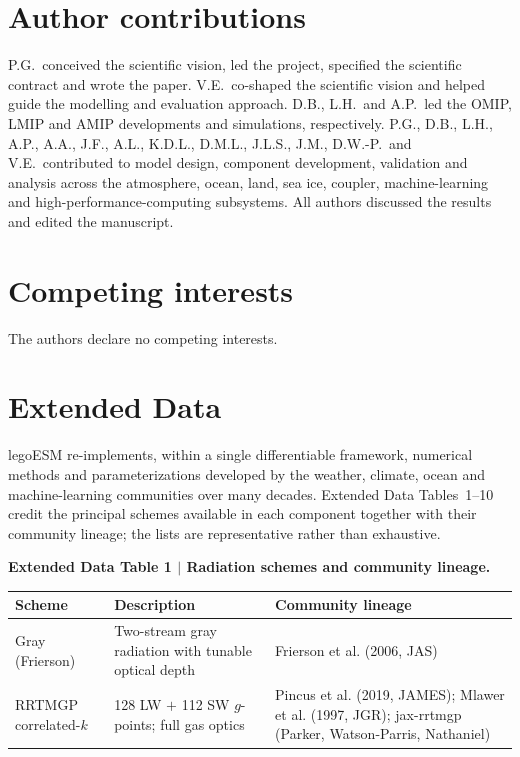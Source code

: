 \documentclass[11pt]{article}
\begin{document}
\section*{Author contributions}
P.G.\ conceived the scientific vision, led the project, specified the scientific contract and
wrote the paper. V.E.\ co-shaped the scientific vision and helped guide the modelling and
evaluation approach. D.B., L.H.\ and A.P.\ led the OMIP, LMIP and AMIP developments and
simulations, respectively. P.G., D.B., L.H., A.P., A.A., J.F., A.L., K.D.L., D.M.L., J.L.S., J.M., D.W.-P.\ and
V.E.\ contributed to model design, component development, validation and analysis across the
atmosphere, ocean, land, sea ice, coupler, machine-learning and high-performance-computing
subsystems. All authors discussed the results and edited the manuscript.

\section*{Competing interests}
The authors declare no competing interests.

\section*{Extended Data}
\noindent legoESM re-implements, within a single differentiable framework, numerical methods and
parameterizations developed by the weather, climate, ocean and machine-learning communities over
many decades. Extended Data Tables~1--10 credit the principal schemes available in each component
together with their community lineage; the lists are representative rather than exhaustive.

\footnotesize
\renewcommand{\arraystretch}{1.2}
\newcommand{\edthead}{\toprule \textbf{Scheme} & \textbf{Description} & \textbf{Community lineage} \\ \midrule}

\smallskip
\noindent\textbf{Extended Data Table 1 $\vert$ Radiation schemes and community lineage.}\\[3pt]
\begin{tabular}{@{}p{3.0cm} p{5.7cm} p{6.3cm}@{}}
\edthead
Gray (Frierson) & Two-stream gray radiation with tunable optical depth & Frierson et al. (2006, JAS) \\
RRTMGP correlated-$k$ & 128 LW $+$ 112 SW $g$-points; full gas optics & Pincus et al. (2019, JAMES); Mlawer et al. (1997, JGR); jax-rrtmgp (Parker, Watson-Parris, Nathaniel) \\
\bottomrule
\end{tabular}
\end{document}
